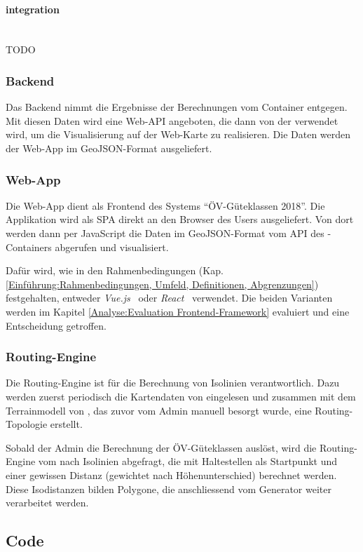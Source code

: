 \paragraph{integration}~\\
TODO

\subsubsection{Backend}
\label{container:Backend}

Das Backend nimmt die Ergebnisse der Berechnungen vom Container  entgegen.
Mit diesen Daten wird eine Web-\ac{API} angeboten, die dann von der  verwendet wird, um die Visualisierung auf der Web-Karte zu realisieren.
Die Daten werden der Web-App im \gls{GeoJSON}-Format ausgeliefert.


\subsubsection{Web-App}
\label{container:Web-App}

Die Web-App dient als Frontend des Systems "`\acs{ÖV}-Güteklassen 2018"'.
Die Applikation wird als \ac{SPA} direkt an den Browser des Users ausgeliefert.
Von dort werden dann per JavaScript die Daten im \gls{GeoJSON}-Format vom \ac{API} des -Containers abgerufen und visualisiert.

Dafür wird, wie in den Rahmenbedingungen (Kap. \ref{Einführung:Rahmenbedingungen, Umfeld, Definitionen, Abgrenzungen}) festgehalten, entweder \emph{Vue.js}~\cite{vuejs} oder \emph{React}~\cite{react} verwendet.
Die beiden Varianten werden im Kapitel \ref{Analyse:Evaluation Frontend-Framework} evaluiert und eine Entscheidung getroffen.

\subsubsection{Routing-Engine}
\label{container:Routing-Engine}

Die Routing-Engine ist für die Berechnung von Isolinien verantwortlich.
Dazu werden zuerst periodisch die Kartendaten von  eingelesen und zusammen mit dem \gls{Terrainmodell} von , das zuvor vom Admin manuell besorgt wurde, eine Routing-Topologie erstellt.

Sobald der Admin die Berechnung der ÖV-Güteklassen auslöst, wird die Routing-Engine vom  nach Isolinien abgefragt, die mit Haltestellen als Startpunkt und einer gewissen Distanz (gewichtet nach Höhenunterschied) berechnet werden.
Diese Isodistanzen bilden Polygone, die anschliessend vom Generator weiter verarbeitet werden.


\subsection{Code}
\label{Architektur:Code}

